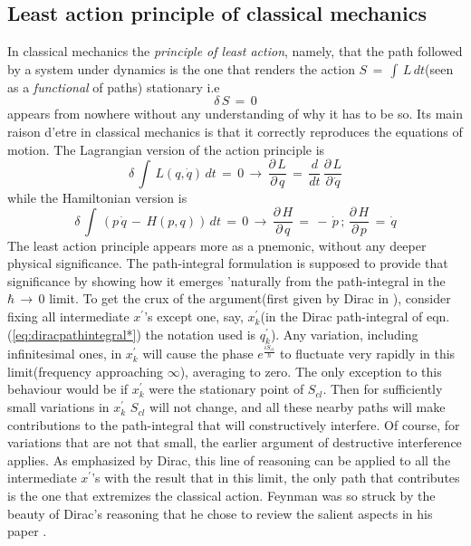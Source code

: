 \documentclass[a4paper]{JHEP3}
\newcommand{\be}{\begin{equation}}
\newcommand{\ee}{\end{equation}}
\begin{document}
\subsection{Least action principle of classical mechanics}
In classical mechanics the {\it principle of least action}, namely, that the path followed by a system under dynamics is the one
that renders the action $S\,=\,\int\,L\,dt$(seen as a {\it functional} of paths) stationary i.e
\be
\label{eq:leastactioncm}
\delta\,S\,=\,0
\ee
appears from nowhere without any understanding of why it has to be so. Its main raison d'etre in classical mechanics is that it correctly
reproduces the equations of motion. The Lagrangian version of the action principle is
\be
\label{eq:eulerlagrange}
\delta\,\int\,L(q,{\dot q})\,dt\,=\,0\,\rightarrow\,\frac{\partial\,L}{\partial\,q}\,=\,\frac{d}{dt}\,\frac{\partial\,L}{\partial\,{\dot q}}
\ee
while the Hamiltonian version is
\be
\label{eq:hamiltoneqns}
\delta\,\int\,(p\,{\dot q}\,-\,H(p,q))\,dt\,=\,0\,\rightarrow\,\frac{\partial\,H}{\partial\,q}\,=\,-\,{\dot p}\,;\,\frac{\partial\,H}{\partial\,p}\,=\,{\dot q}
\ee
The least action principle appears more as a pnemonic, without any deeper physical significance. The path-integral formulation is supposed
to provide that significance by showing how it emerges 'naturally from the path-integral in the $\hbar\,\rightarrow\,0$ limit. To get the
crux of the argument(first given by Dirac in \cite{diracpaper}), consider fixing all intermediate $x^\prime$'s except one, say,
$x_k^\prime$(in the Dirac path-integral of eqn.(\ref{eq:diracpathintegral*}) the notation used is $q_k^\prime$). 
Any variation,
including infinitesimal ones,
in $x_k^\prime$ will cause the phase $e^{\frac{iS_{cl}}{\hbar}}$ to fluctuate very rapidly in this limit(frequency approaching $\infty$), 
averaging to zero.
The only exception to this behaviour would be if $x_k^\prime$ were the stationary point of $S_{cl}$. Then for sufficiently small variations 
in $x_k^\prime$ 
$S_{cl}$ will not change, and all these nearby paths will make contributions to the path-integral that will constructively interfere. 
Of course, for
variations that are not that small, the earlier argument of destructive interference applies. As emphasized by Dirac, this line of
reasoning can be applied to all the intermediate $x^\prime$'s with the result that in this limit, the only path that contributes is the one that
extremizes the classical action. Feynman was so struck by the beauty of Dirac's reasoning that he chose to review the salient aspects in
his paper \cite{feynpaper}.
\end{document}
